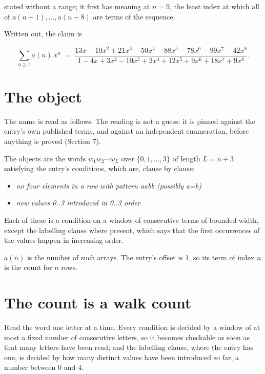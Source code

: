 \documentclass[11pt]{article}
\theoremstyle{definition}
\begin{document}
stated without a range; it first has meaning at $n = 9$, the least index at which all of $a(n-1),\dots,a(n-8)$ are terms of the sequence.

Written out, the claim is

\[\sum_{n \ge 1} a(n)\,x^n \;=\; \frac{13x - 10x^{2} + 21x^{3} - 50x^{4} - 88x^{5} - 78x^{6} - 99x^{7} - 42x^{8}}{1 - 4x + 3x^{2} - 10x^{3} + 2x^{4} + 12x^{5} + 9x^{6} + 18x^{7} + 9x^{8}}.\]

\section{The object}

The name is read as follows. The reading is not a guess: it is pinned against the entry's own published terms, and against an independent enumeration, before anything is proved (Section 7).

The objects are the words $w_1 w_2 \cdots w_L$ over $\{0,1,\dots,3\}$ of length $L = n + 3$ satisfying the entry's conditions, which are, clause by clause:

\begin{itemize}

\item {\itshape no four elements in a row with pattern aabb (possibly a=b)}

\item {\itshape new values 0..3 introduced in 0..3 order}

\end{itemize}

Each of these is a condition on a window of consecutive terms of bounded width, except the labelling clause where present, which says that the first occurrences of the values happen in increasing order.

$a(n)$ is the number of such arrays. The entry's offset is 1, so its term of index $n$ is the count for $n$ rows.

\section{The count is a walk count}

Read the word one letter at a time. Every condition is decided by a window of at most a fixed number of consecutive letters, so it becomes checkable as soon as that many letters have been read; and the labelling clause, where the entry has one, is decided by how many distinct values have been introduced so far, a number between $0$ and 4.
\end{document}
